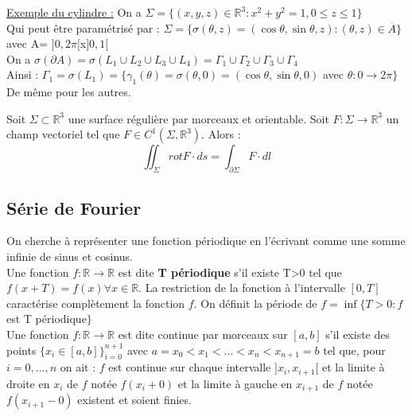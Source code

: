 \documentclass[../main.tex]{subfiles}
\begin{document}
\underline{Exemple du cylindre :} On a $\Sigma = \{(x,y,z) \in \mathbb{R}^3 : x^2+y^2 = 1, 0\leq z \leq 1\}$\\
Qui peut être paramétrisé par : $\Sigma = \{\sigma(\theta, z) = (\cos{\theta}, \sin{\theta}, z) : (\theta, z) \in \overline{A}\}$ avec A= $]0,2\pi[$x$]0,1[$\\
On a $\sigma(\partial A) = \sigma(L_1 \cup L_2 \cup L_3 \cup L_4) = \Gamma_1 \cup \Gamma_2 \cup \Gamma_3 \cup \Gamma_4$\\
Ainsi : $\Gamma_1 = \sigma(L_1) = \{\gamma_1(\theta) = \sigma(\theta, 0) = (\cos{\theta}, \sin{\theta}, 0)$ avec $\theta : 0\rightarrow 2\pi\}$ De même pour les autres.\\

\begin{theorem}
Soit $\Sigma \subset \mathbb{R}^3$ une surface régulière par morceaux et orientable. Soit $F:\Sigma \rightarrow \mathbb{R}^3$ un champ vectoriel tel que $F\in C^1(\Sigma, \mathbb{R}^3)$. Alors :\\
\begin{equation}
    \iint_{\Sigma} rot F\cdot ds=\int_{\partial \Sigma} F\cdot dl
\end{equation}
\end{theorem}

\subsection{Série de Fourier}
On cherche à représenter une fonction périodique en l'écrivant comme une somme infinie de sinus et cosinus.\\

Une fonction $f:\mathbb{R} \rightarrow \mathbb{R}$ est dite \textbf{T périodique} s'il existe T>0 tel que $f(x+T) = f(x) \forall x\in \mathbb{R}$. La restriction de la fonction à l'intervalle $[0,T]$ caractérise complètement la fonction $f$. On définit la période de $f = \inf\{T>0 : f$est T périodique$\}$\\

Une fonction $f:\mathbb{R}\rightarrow \mathbb{R}$ est dite continue par morceaux sur $[a,b]$ s'il existe des points $\{x_i \in[a,b]\}_{i=0}^{n+1}$ avec $a=x_0 < x_1 < \dots < x_n < x_{n+1} = b$ tel que, pour $i=0,\dots, n$ on ait : $f$ est continue sur chaque intervalle $]x_i, x_{i+1}[$ et la limite à droite en $x_i$ de $f$ notée $f(x_i +0)$ et la limite à gauche en $x_{i+1}$ de $f$ notée $f(x_{i+1}-0)$ existent et soient finies.\\
\end{document}
